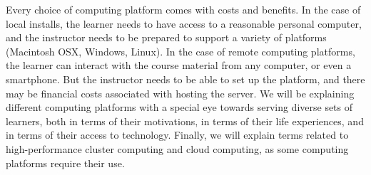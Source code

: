 
Every choice of computing platform comes with costs and benefits. 
In the case of local installs, the learner needs to have access to a reasonable personal computer, and the instructor needs to be prepared to support a variety of platforms (Macintosh OSX, Windows, Linux). 
In the case of remote computing platforms, the learner can interact with the course material from any computer, or even a smartphone.
But the instructor needs to be able to set up the platform, and there may be financial costs associated with hosting the server.
We will be explaining different computing platforms with a special eye towards serving diverse sets of learners, both in terms of their motivations, in terms of their life experiences, and in terms of their access to technology.
Finally, we will explain terms related to high-performance cluster computing and cloud computing, as some computing platforms require their use.

